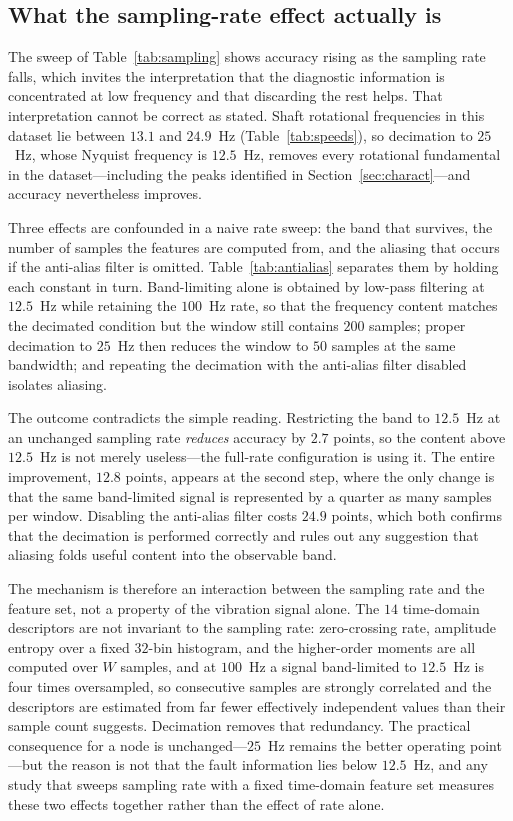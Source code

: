\subsection{What the sampling-rate effect actually is}
\label{subsec:antialias}
The sweep of Table~\ref{tab:sampling} shows accuracy rising as the sampling rate
falls, which invites the interpretation that the diagnostic information is
concentrated at low frequency and that discarding the rest helps. That
interpretation cannot be correct as stated. Shaft rotational frequencies in this
dataset lie between $13.1$ and $24.9$~Hz (Table~\ref{tab:speeds}), so decimation
to $25$~Hz, whose Nyquist frequency is $12.5$~Hz, removes every rotational
fundamental in the dataset---including the peaks identified in
Section~\ref{sec:charact}---and accuracy nevertheless improves.

Three effects are confounded in a naive rate sweep: the band that survives, the
number of samples the features are computed from, and the aliasing that occurs if
the anti-alias filter is omitted. Table~\ref{tab:antialias} separates them by
holding each constant in turn. Band-limiting alone is obtained by low-pass
filtering at $12.5$~Hz while retaining the $100$~Hz rate, so that the frequency
content matches the decimated condition but the window still contains $200$
samples; proper decimation to $25$~Hz then reduces the window to $50$ samples at
the same bandwidth; and repeating the decimation with the anti-alias filter
disabled isolates aliasing.

The outcome contradicts the simple reading. Restricting the band to $12.5$~Hz at
an unchanged sampling rate \emph{reduces} accuracy by $2.7$ points, so the content
above $12.5$~Hz is not merely useless---the full-rate configuration is using it.
The entire improvement, $12.8$ points, appears at the second step, where the only
change is that the same band-limited signal is represented by a quarter as many
samples per window. Disabling the anti-alias filter costs $24.9$ points, which
both confirms that the decimation is performed correctly and rules out any
suggestion that aliasing folds useful content into the observable band.

The mechanism is therefore an interaction between the sampling rate and the
feature set, not a property of the vibration signal alone. The $14$ time-domain
descriptors are not invariant to the sampling rate: zero-crossing rate, amplitude
entropy over a fixed $32$-bin histogram, and the higher-order moments are all
computed over $W$ samples, and at $100$~Hz a signal band-limited to $12.5$~Hz is
four times oversampled, so consecutive samples are strongly correlated and the
descriptors are estimated from far fewer effectively independent values than their
sample count suggests. Decimation removes that redundancy. The practical
consequence for a node is unchanged---$25$~Hz remains the better operating
point---but the reason is not that the fault information lies below $12.5$~Hz, and
any study that sweeps sampling rate with a fixed time-domain feature set measures
these two effects together rather than the effect of rate alone.

